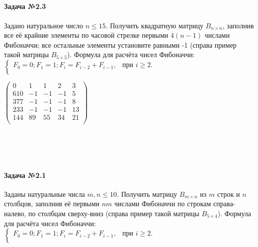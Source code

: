\documentclass[12pt,a4paper]{report}
\begin{document}
\\ \\ \\
\noindent %
\begin{minipage}{0.75\textwidth}
\paragraph*{Задача №2.3}
Задано натуральное число $n \le 15$. Получить квадратную матрицу $B_{n \times n}$, заполнив все её крайние элементы по часовой стрелке первыми $4(n-1)$ числами Фибоначчи; все остальные элементы установите равными -1 (справа пример такой матрицы $B_{5 \times 5}$). Формула для расчёта чисел Фибоначчи: \\
$\begin{cases}
F_0 = 0; F_1 = 1; F_i = F_{i-2} + F_{i-1}, & \text{при } i \ge 2. \\
\end{cases}$
\end{minipage}
\hfill
\begin{minipage}{0.24\textwidth}
$\begin{pmatrix}
0 & 1 & 1 & 2 & 3 \\
610 & -1 & -1 & -1 & 5 \\
377 & -1 & -1 & -1 & 8 \\
233 & -1 & -1 & -1 & 13 \\
144 & 89 & 55 & 34 & 21 \\
\end{pmatrix}$
\end{minipage}
\\ \\ \\
\noindent %
\begin{minipage}{0.75\textwidth}
\paragraph*{Задача №2.1}
Заданы натуральные числа $m, n \le 10$. Получить матрицу $B_{m \times n}$ из $m$ строк и $n$ столбцов, заполнив её первыми $nm$ числами Фибоначчи по строкам справа-налево, по столбцам сверху-вниз (справа пример такой матрицы $B_{5 \times 4}$). Формула для расчёта чисел Фибоначчи: \\
$\begin{cases}
F_0 = 0; F_1 = 1; F_i = F_{i-2} + F_{i-1}, & \text{при } i \ge 2. \\
\end{cases}$
\end{minipage}
\end{document}
